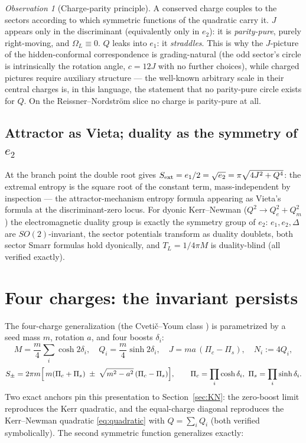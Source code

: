 \documentclass[11pt]{article}
\theoremstyle{definition}
\theoremstyle{remark}
\newtheorem{observation}[theorem]{Observation}
\newcommand{\disc}{\Delta}
\begin{document}
\begin{observation}[Charge-parity principle]
\label{obs:parity}
A conserved charge couples to the sectors according to which symmetric
functions of the quadratic carry it. $J$ appears only in the discriminant
(equivalently only in $e_2$): it is \emph{parity-pure}, purely right-moving,
and $\Omega_L\equiv0$. $Q$ leaks into $e_1$: it \emph{straddles}. This is why
the $J$-picture of the hidden-conformal correspondence is grading-natural
(the odd sector's circle is intrinsically the rotation angle, $c=12J$ with no
further choices), while charged pictures require auxiliary structure --- the
well-known arbitrary scale in their central charges is, in this language, the
statement that no parity-pure circle exists for $Q$. On the
Reissner--Nordstr\"om slice no charge is parity-pure at all.
\end{observation}

\subsection{Attractor as Vieta; duality as the symmetry of
\texorpdfstring{$e_2$}{e2}}

At the branch point the double root gives
$S_{\rm ext}=e_1/2=\sqrt{e_2}=\pi\sqrt{4J^2+Q^4}$: the extremal entropy is the
square root of the constant term, mass-independent by inspection --- the
attractor-mechanism entropy formula \cite{Moore} appearing as Vieta's formula
at the discriminant-zero locus. For dyonic Kerr--Newman
($Q^2\to Q_e^2+Q_m^2$) the electromagnetic duality group is exactly the
symmetry group of $e_2$: $e_1,e_2,\disc$ are $SO(2)$-invariant, the sector
potentials transform as duality doublets, both sector Smarr formulas hold
dyonically, and $T_L=1/4\pi M$ is duality-blind (all verified exactly).

\section{Four charges: the invariant persists}
\label{sec:fourcharge}

The four-charge generalization (the Cveti\v{c}--Youm class \cite{CY,Std4Q})
is parametrized by a seed mass $m$, rotation $a$, and four boosts $\delta_i$:
\begin{equation}
M=\frac{m}{4}\sum_i\cosh2\delta_i,\quad
Q_i=\frac{m}{4}\sinh2\delta_i,\quad
J=ma\,(\Pi_c-\Pi_s),\quad
N_i:=4Q_i ,
\end{equation}
\begin{equation}
S_\pm = 2\pi m\Bigl[\,m(\Pi_c+\Pi_s)\;\pm\;\sqrt{m^2-a^2}\,(\Pi_c-\Pi_s)\Bigr],
\qquad \Pi_c=\prod_i\cosh\delta_i,\ \Pi_s=\prod_i\sinh\delta_i .
\label{eq:fourchargeS}
\end{equation}
Two exact anchors pin this presentation to Section~\ref{sec:KN}: the
zero-boost limit reproduces the Kerr quadratic, and the equal-charge diagonal
reproduces the Kerr--Newman quadratic \eqref{eq:quadratic} with
$Q=\sum_iQ_i$ (both verified symbolically). The second symmetric function
generalizes exactly:
\end{document}
